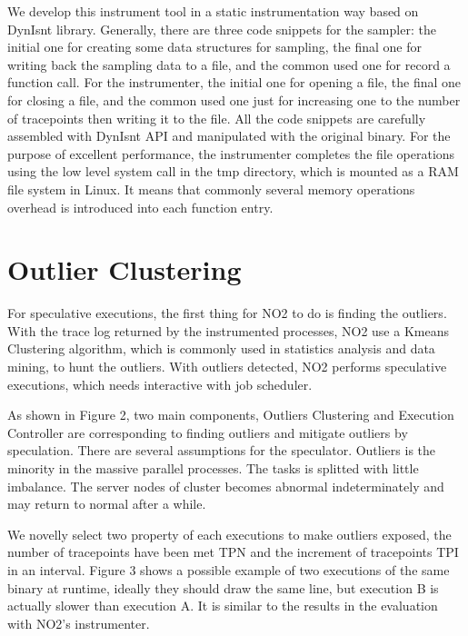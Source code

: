 We develop this instrument tool in a static instrumentation way based on DynIsnt library. Generally, there are three code snippets for the sampler: the initial one for creating some data structures for sampling, the final one for writing back the sampling data to a file, and the common used one for record a function call. For the instrumenter, the initial one for opening a file, the final one for closing a file, and the common used one just for increasing one to the number of tracepoints then writing it to the file. All the code snippets are carefully assembled with DynIsnt API and manipulated with the original binary. For the purpose of excellent performance, the instrumenter completes the file operations using the low level system call in the tmp directory, which is mounted as a RAM file system in Linux. It means that commonly several memory operations overhead is introduced into each function entry.

\section{Outlier Clustering}
For speculative executions, the first thing for NO2 to do is finding the outliers. With the trace log returned by the instrumented processes, NO2 use a Kmeans Clustering algorithm, which is commonly used in statistics analysis and data mining, to hunt the outliers. With outliers detected, NO2 performs speculative executions, which needs interactive with job scheduler. 

As shown in Figure 2, two main components, Outliers Clustering and Execution Controller are corresponding to finding outliers and mitigate outliers by speculation. There are several assumptions for the speculator. Outliers is the minority in the massive parallel processes. The tasks is splitted with little imbalance. The server nodes of cluster becomes abnormal indeterminately and may return to normal after a while.

We novelly select two property of each executions to make outliers exposed, the number of tracepoints have been met TPN and the increment of tracepoints TPI in an interval. Figure 3 shows a possible example of two executions of the same binary at runtime, ideally they should draw the same line, but execution B is actually slower than execution A. It is similar to the results in the evaluation with NO2’s instrumenter. 

